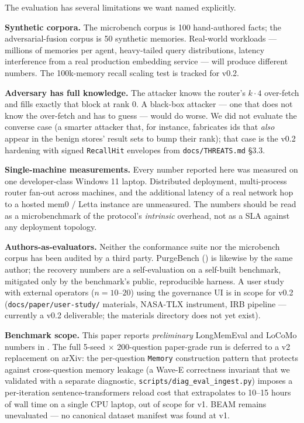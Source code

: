 \documentclass[11pt,letterpaper,twocolumn]{article}
\begin{document}
The evaluation has several limitations we want named explicitly.

\textbf{Synthetic corpora.} The microbench corpus is 100 hand-authored facts; the adversarial-fusion corpus is 50 synthetic memories. Real-world workloads --- millions of memories per agent, heavy-tailed query distributions, latency interference from a real production embedding service --- will produce different numbers. The 100k-memory recall scaling test is tracked for v0.2.

\textbf{Adversary has full knowledge.} The  attacker knows the router's $k \cdot 4$ over-fetch and fills exactly that block at rank 0. A black-box attacker --- one that does not know the over-fetch and has to guess --- would do worse. We did not evaluate the converse case (a smarter attacker that, for instance, fabricates ids that \emph{also} appear in the benign stores' result sets to bump their rank); that case is the v0.2 hardening with signed \texttt{RecallHit} envelopes from \texttt{docs/THREATS.md} \S3.3.

\textbf{Single-machine measurements.} Every number reported here was measured on one developer-class Windows 11 laptop. Distributed deployment, multi-process router fan-out across machines, and the additional latency of a real network hop to a hosted mem0 / Letta instance are unmeasured. The numbers should be read as a microbenchmark of the protocol's \emph{intrinsic} overhead, not as a SLA against any deployment topology.

\textbf{Authors-as-evaluators.} Neither the conformance suite nor the microbench corpus has been audited by a third party. PurgeBench () is likewise by the same author; the recovery numbers are a self-evaluation on a self-built benchmark, mitigated only by the benchmark's public, reproducible harness. A user study with external operators ($n=10$--$20$) using the governance UI is in scope for v0.2 (\texttt{docs/paper/user-study/} materials, NASA-TLX instrument, IRB pipeline --- currently a v0.2 deliverable; the materials directory does not yet exist).

\textbf{Benchmark scope.} This paper reports \emph{preliminary} LongMemEval and LoCoMo numbers in . The full 5-seed $\times$ 200-question paper-grade run is deferred to a v2 replacement on arXiv: the per-question \texttt{Memory} construction pattern that protects against cross-question memory leakage (a Wave-E correctness invariant that we validated with a separate diagnostic, \texttt{scripts/diag\_eval\_ingest.py}) imposes a per-iteration sentence-transformers reload cost that extrapolates to 10--15 hours of wall time on a single CPU laptop, out of scope for v1. BEAM remains unevaluated --- no canonical dataset manifest was found at v1.
\end{document}
